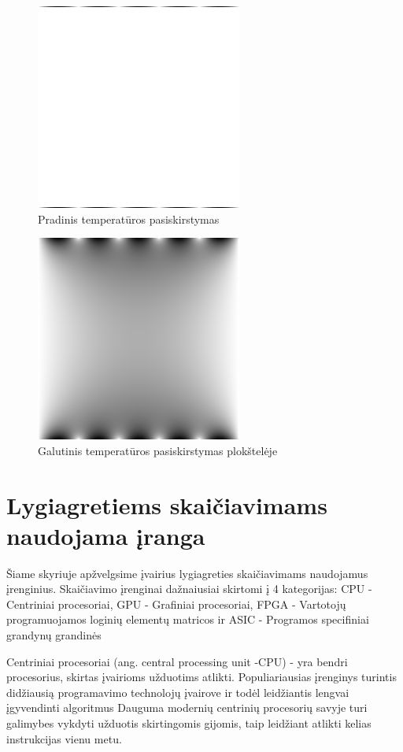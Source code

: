 \documentclass{VUMIFPSbakalaurinis}
\begin{document}
\begin{figure}[H]
    \centering
    \includegraphics[scale=0.7]{img/image_0000000.png}
    \caption{Pradinis temperatūros pasiskirstymas}
    \label{img:start}
\end{figure}

\begin{figure}[H]
    \centering
    \includegraphics[scale=0.7]{img/image_1000000.png}
    \caption{Galutinis temperatūros pasiskirstymas plokštelėje}
    \label{img:end}
\end{figure}


\section{Lygiagretiems skaičiavimams naudojama įranga}
Šiame skyriuje apžvelgsime įvairius lygiagreties skaičiavimams naudojamus įrenginius. 
Skaičiavimo įrenginai dažnaiusiai skirtomi į 4 kategorijas: CPU - Centriniai procesoriai, GPU - Grafiniai procesoriai, FPGA - Vartotojų programuojamos loginių elementų matricos ir ASIC - Programos specifiniai grandynų grandinės \cite{nurvitadhi2016accelerating}

Centriniai procesoriai (ang. central processing unit -CPU) - yra bendri procesorius, skirtas įvairioms užduotims atlikti.
Populiariausias įrenginys turintis didžiausią programavimo technolojų įvairove ir todėl leidžiantis lengvai įgyvendinti algoritmus
Dauguma modernių centrinių procesorių savyje turi galimybes vykdyti užduotis skirtingomis gijomis, taip leidžiant atlikti kelias instrukcijas vienu metu.
\end{document}
